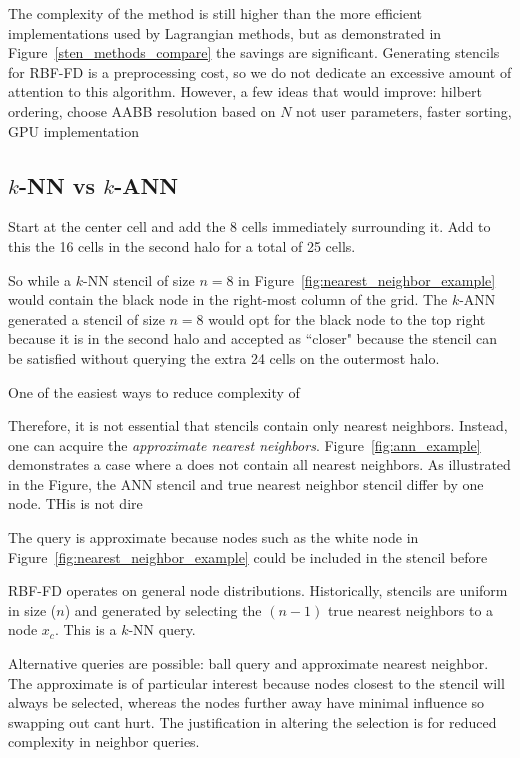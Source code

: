 \documentclass{report}
\begin{document}
The complexity of the method is still higher than the more efficient implementations used by Lagrangian methods, but as demonstrated in Figure~\ref{sten_methods_compare} the savings are significant. Generating stencils for RBF-FD is a preprocessing cost, so we do not dedicate an excessive amount of attention to this algorithm. However, a few ideas that would improve: hilbert ordering, choose AABB resolution based on $N$ not user parameters, faster sorting, GPU implementation




\subsection{$k$-NN vs $k$-ANN} 

Start at the center cell and add the 8 cells immediately surrounding it. Add to this the 16 cells in the second halo for a total of 25 cells. 

So while a $k$-NN stencil of size $n=8$ in Figure~\ref{fig:nearest_neighbor_example} would contain the black node in the right-most column of the grid. The $k$-ANN generated a stencil of size $n=8$ would opt for the black node to the top right because it is in the second halo and accepted as ``closer" because the stencil can be satisfied without querying the extra 24 cells on the outermost halo. 


One of the easiest ways to reduce complexity of 


Therefore, it is not essential that stencils contain only nearest neighbors. Instead, one can acquire the \emph{approximate nearest neighbors}. Figure~\ref{fig:ann_example} demonstrates a case where a does not contain all nearest neighbors. As illustrated in the Figure, the ANN stencil and true nearest neighbor stencil differ by one node. THis is not dire


The query is approximate because nodes such as the white node in Figure~\ref{fig:nearest_neighbor_example} could be included in the stencil before 


RBF-FD operates on general node distributions. Historically, stencils are uniform in size ($n$) and generated by selecting the $(n-1)$ true nearest neighbors to a node $x_c$. This is a $k$-NN query. 

Alternative queries are possible: ball query and approximate nearest neighbor. The approximate is of particular interest because nodes closest to the stencil will always be selected, whereas the nodes further away have minimal influence so swapping out cant hurt. The justification in altering the selection is for reduced complexity in neighbor queries.  
\end{document}
